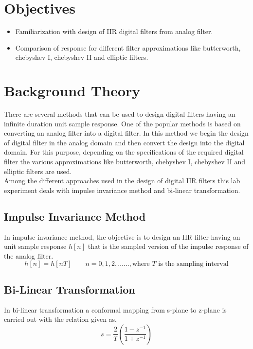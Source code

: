 \documentclass{lab_sheet}
\begin{document}
\clearpage
\tableofcontents
\clearpage
{}
{}
\listoffigures
\clearpage
{}
{}
\lstlistoflistings
\clearpage
{}
\section{Objectives}
\begin{itemize}
	\item Familiarization with design of IIR digital filters from analog filter.
	\item Comparison of response for different filter approximations like butterworth, chebyshev I, chebyshev II and elliptic filters.
\end{itemize}
\section{Background Theory}
There are several methods that can be used to design digital filters having an infinite duration unit sample response. One of the popular methods is based on converting an analog filter into a digital filter. In this method we begin the design of digital filter in the analog domain and then convert the design into the digital domain. For this purpose, depending on the specifications of the required digital filter the various approximations like butterworth, chebyshev I, chebyshev II and elliptic filters are used.\\
Among the different approaches used in the design of digital IIR filters this lab experiment deals with impulse invariance method and bi-linear transformation.
\subsection{Impulse Invariance Method}
In impulse invariance method, the objective is to design an IIR filter having an unit sample response $h[n]$ that is the sampled version of the impulse response of the analog filter.
\begin{equation*}
    h[n]=h[nT] \quad \quad n=0,1,2,\dots\dots, \text{where } T\text{ is the sampling interval}
\end{equation*}
\subsection{Bi-Linear Transformation}
In bi-linear transformation a conformal mapping from s-plane to z-plane is carried out with the relation given as,
\begin{equation*}
    s=\frac{2}{T}\left(\frac{1-z^{-1}}{1+z^{-1}}\right)
\end{equation*}
\end{document}

